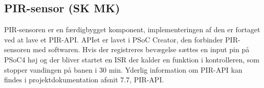 \subsection{PIR-sensor (SK MK)}

PIR-sensoren er en færdigbygget komponent, implementeringen af den er fortaget ved at lave et PIR-API. APIet er lavet i PSoC Creator, den forbinder PIR-sensoren med softwaren. Hvis der registreres bevægelse sættes en input pin på PSoC4 høj og der bliver startet en ISR der kalder en funktion i kontrolleren, som stopper vandingen på banen i 30 min. Yderlig information om PIR-API kan findes i projektdokumentation afsnit 7.7, PIR-API. 